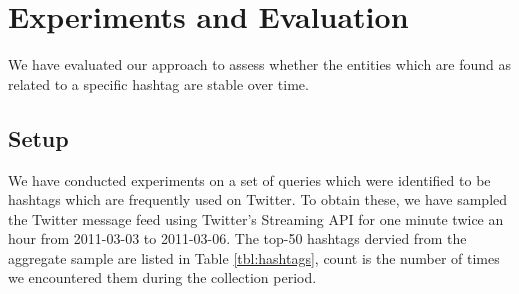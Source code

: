 \documentclass{llncs}
\begin{document}
\section{Experiments and Evaluation}
\label{sect:eval}

We have evaluated our approach to assess whether the entities which are found as related to a specific hashtag are stable over time.

\subsection{Setup}

We have conducted experiments on a set of queries which were identified to be hashtags which are frequently used on Twitter.
To obtain these, we have sampled the Twitter message feed using Twitter's
Streaming API for one minute twice an hour from 2011-03-03 to 2011-03-06. The
top-50 hashtags dervied from the aggregate sample are listed in Table
\ref{tbl:hashtags}, count is the number of times we encountered them during the
collection period.
\end{document}
